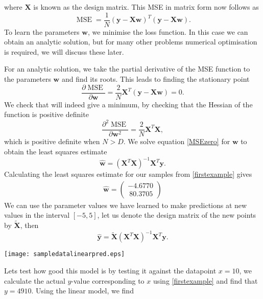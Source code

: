 \documentclass[english]{article}
\begin{document}
where $\textbf{X}$ is known as the design matrix. This MSE in matrix form now follows as
\begin{equation}
\operatorname{MSE} = \frac{1}{N} (\textbf{y}-\textbf{X}\textbf{w})^T(\textbf{y}-\textbf{X}\textbf{w}).
\end{equation}
To learn the parameters $\textbf{w}$, we minimise the loss function. In this case we can obtain an analytic solution, but for many other problems numerical optimisation is required, we will discuss these later.

For an analytic solution, we take the partial derivative of the MSE function to the parameters $\textbf{w}$ and find its roots. This leads to finding the stationary point
\begin{equation}\label{MSEzero}
\frac{\partial\operatorname{MSE}}{\partial \textbf{w}} = \frac{2}{N} \textbf{X}^T(\textbf{y}-\textbf{X}\textbf{w}) = 0.
\end{equation}
We check that will indeed give a minimum, by checking that the Hessian of the function is positive definite
\begin{equation}
\frac{\partial^2\operatorname{MSE}}{\partial \textbf{w}^2} = \frac{2}{N} \textbf{X}^T\textbf{X},
\end{equation}
which is positive definite when $N>D$.
We solve equation \ref{MSEzero} for $\textbf{w}$ to obtain the least squares estimate 
\begin{equation}\label{wMLE}
\hat{\textbf{w}} = (\textbf{X}^T\textbf{X})^{-1}\textbf{X}^T\textbf{y}.
\end{equation}
Calculating the least squares estimate for our samples from \ref{firstexample} gives
\begin{align*}
\hat{\textbf{w}} = \begin{pmatrix}
-4.6770 \\
\ 80.3705
\end{pmatrix}
\end{align*}
We can use the parameter values we have learned to make predictions at new values in the interval $[-5,5]$, let us denote the design matrix of the new points by $\tilde{\textbf{X}}$, then
\begin{equation}
\hat{\textbf{y}} = \tilde{\textbf{X}} (\textbf{X}^T\textbf{X})^{-1}\textbf{X}^T\textbf{y}.
\end{equation}
\begin{center}
	\texttt{[image: sampledatalinearpred.eps]}
\end{center}
Lets test how good this model is by testing it against the datapoint $x=10$, we calculate the actual $y$-value corresponding to $x$ using \ref{firstexample} and find that $y=4910$. Using the linear model, we find
\end{document}

